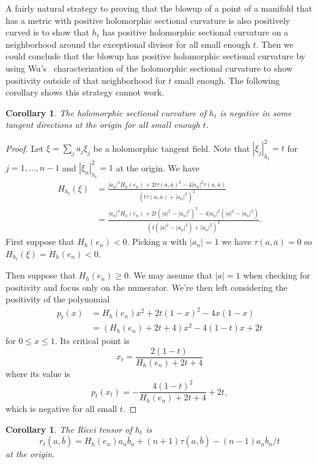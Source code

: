\documentclass[10pt,a4paper]{amsart}
\newtheorem{coro}[theo]{Corollary}
\def\hsc{holomorphic sectional curvature}
\begin{document}
A fairly natural strategy to proving that the blowup of a point of a manifold
that has a metric with positive \hsc{} is also positively curved is to
show that $h_t$ has positive \hsc{} on a neighborhood around the exceptional
divisor for all small enough $t$. Then we could conclude that the blowup has
positive \hsc{} by using Wu's~\cite{wu1973remark} characterization of the
\hsc{} to show positivity outside of that neighborhood for $t$ small enough.
The following corollary shows this strategy cannot work.


\begin{coro}
The holomorphic sectional curvature of $h_t$ is negative in
some tangent directions at the origin for all small enough $t$.
\end{coro}

\begin{proof}
Let $\xi = \sum_j a_j \xi_j$ be a holomorphic tangent field.
Note that $|\xi_j|_{h_t}^2 = t$ for $j = 1, \ldots, n-1$ and $|\xi_n|_{h_t}^2 = 1$
at the origin.
We have
\begin{align*}
H_{h_t}(\xi)
&= \frac{|a_n|^4 H_h(e_n)
+ 2t \tau(a, \bar a)^2
- 4 |a_n|^2 \tau(a, \bar a)}{(t \tau(a, \bar a) + |a_n|^2)^2}
\\
&= \frac{|a_n|^4 H_h(e_n)
+ 2t (|a|^2 - |a_n|^2)^2
- 4 |a_n|^2 (|a|^2 - |a_n|^2)}{(t (|a|^2 - |a_n|^2) + |a_n|^2)^2}.
\end{align*}
First suppose that $H_h(e_n) < 0$. Picking $a$ with $|a_n| = 1$ we have
$\tau(a, \bar a) = 0$ so $H_{h_t}(\xi) = H_h(e_n) < 0$.

Then suppose that $H_h(e_n) \geq 0$.
We may assume that $|a| = 1$ when checking for positivity and focus only on
the numerator. We're then left considering the positivity of the polynomial
\begin{align*}
p_t(x)
&= H_h(e_n) x^2 + 2t(1-x)^2 - 4x(1-x)
\\
&= (H_h(e_n) + 2t + 4) x^2 - 4(1 - t) x + 2t
\end{align*}
for $0 \leq x \leq 1$.
Its critical point is
$$
x_t = \frac{2(1-t)}{H_h(e_n) + 2t + 4}
$$
where its value is
$$
p_t(x_t) = -\frac{4(1-t)^2}{H_h(e_n) + 2t + 4} + 2t,
$$
which is negative for all small $t$.
\end{proof}





\begin{coro}
The Ricci tensor of $h_t$ is
$$
r_t(a, \bar b)
= H_h(e_n) a_n \bar b_n
+ (n + 1) \tau(a, \bar b)
- (n-1) a_n \bar b_n / t
$$
at the origin.
\end{coro}
\end{document}
